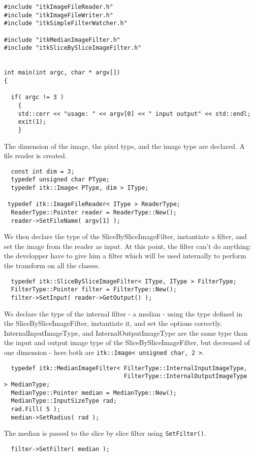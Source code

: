 \documentclass{InsightArticle}
\begin{document}
\small \begin{verbatim}
#include "itkImageFileReader.h"
#include "itkImageFileWriter.h"
#include "itkSimpleFilterWatcher.h"

#include "itkMedianImageFilter.h"
#include "itkSliceBySliceImageFilter.h"


int main(int argc, char * argv[])
{

  if( argc != 3 )
    {
    std::cerr << "usage: " << argv[0] << " input output" << std::endl;
    exit(1);
    }
\end{verbatim} \normalsize
The dimension of the image, the pixel type, and the image type are declared.
A file reader is created.
\small \begin{verbatim}
  const int dim = 3;
  typedef unsigned char PType;
  typedef itk::Image< PType, dim > IType;
 
 typedef itk::ImageFileReader< IType > ReaderType;
  ReaderType::Pointer reader = ReaderType::New();
  reader->SetFileName( argv[1] );
\end{verbatim} \normalsize
We then declare the type of the SliceBySliceImageFilter, instantiate
a filter, and set the image from the reader as input. At this point,
the filter can't do anything: the developper have to give him a filter
which will be used internally to perform the transform on all the classes.
\small \begin{verbatim}
  typedef itk::SliceBySliceImageFilter< IType, IType > FilterType;
  FilterType::Pointer filter = FilterType::New();
  filter->SetInput( reader->GetOutput() );
\end{verbatim} \normalsize
We declare the type of the internal filter - a median - using the type defined
in the SliceBySliceImageFilter, instantiate it, and set the options correctly.
InternalInputImageType, and InternalOutputImageType
are the same type than the input and output image type of the SliceBySliceImageFilter,
but decreased of one dimension - here both are \verb$itk::Image< unsigned char, 2 >$.
\small \begin{verbatim}
  typedef itk::MedianImageFilter< FilterType::InternalInputImageType,
                                  FilterType::InternalOutputImageType > MedianType;
  MedianType::Pointer median = MedianType::New();
  MedianType::InputSizeType rad;
  rad.Fill( 5 );
  median->SetRadius( rad );
\end{verbatim} \normalsize
The median is passed to the slice by slice filter using \verb$SetFilter()$.
\small \begin{verbatim}
  filter->SetFilter( median );
\end{verbatim} \normalsize
\end{document}
